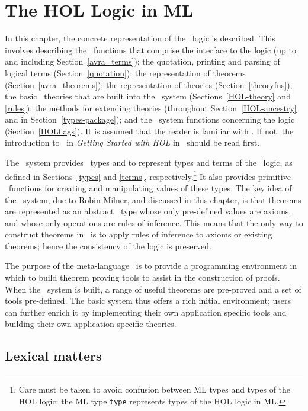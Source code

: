\chapter{The HOL Logic in ML}\label{HOLsyschapter}

In this chapter, the concrete representation of the \HOL\ logic is described.
This involves describing the \ML\ functions that comprise the interface to the
logic (up to and including Section~\ref{avra_terms}); the quotation, printing
and parsing of logical terms (Section~\ref{quotation}); the representation of
theorems (Section~\ref{avra_theorems}); the representation of theories
(Section~\ref{theoryfns}); the basic \HOL\ theories that are built into the
\HOL\ system (Sections~\ref{HOL-theory} and \ref{rules}); the methods for
extending theories (throughout Section~\ref{HOL-ancestry} and in
Section~\ref{types-package}); and the \ML\ system functions concerning the
logic (Section~\ref{HOLflags}).  It is assumed that the reader is familiar
with \ML.  If  not, the introduction to \ML\ in {\sl Getting  Started with
HOL\/} in \TUTORIAL\ should be read first. 

The \HOL\ system provides \ML\ types  and  to represent
types and terms of the \HOL\ logic, as defined in Sections~\ref{types} and
\ref{terms}, respectively.\footnote{Care must be taken to avoid confusion
between ML types and types of the HOL logic: the ML type {\tt type} represents
types of the HOL logic in ML.} It also provides primitive \ML\ functions for
creating and manipulating values of these types.  The key idea of the \HOL\
system, due to Robin Milner, and discussed in this chapter,
is that theorems are represented as an abstract \ML\ type whose only
pre-defined values are axioms, and whose only operations are rules of
inference. This means that the only way to construct theorems in \HOL\ is
to apply rules of inference to axioms or existing theorems; hence the
consistency of the logic is preserved.

The purpose of the meta-language \ML\ is to provide a programming environment
in which to build theorem proving tools to assist in the construction of
proofs.  When the \HOL\ system is built, a range of useful theorems are
pre-proved and a set of tools pre-defined. The basic system thus offers a rich
initial environment; users can further enrich it by implementing their own
application specific tools and building their own application specific
theories.


\section{Lexical matters}
\label{HOL-lex}

